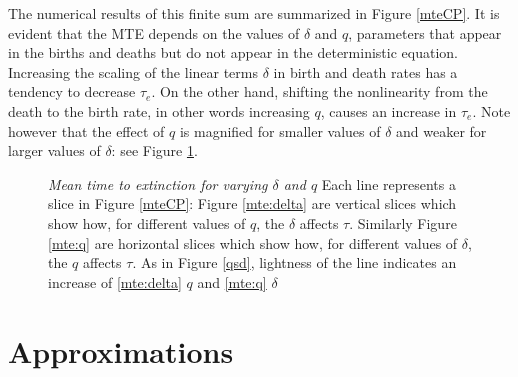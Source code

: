 \documentclass[a4paper,10pt]{article}
\numberwithin{equation}{section} %
\begin{document}
The numerical results of this finite sum are summarized in Figure \ref{mteCP}.
It is evident that the MTE depends on the values of $\delta$ and $q$, parameters that appear in the births and deaths but do not appear in the deterministic equation. 
Increasing the scaling of the linear terms $\delta$ in birth and death rates has a tendency to decrease $\tau_e$. 
On the other hand, shifting the nonlinearity from the death to the birth rate, in other words increasing $q$, causes an increase in $\tau_e$. 
Note however that the effect of $q$ is magnified for smaller values of $\delta$ and weaker for larger values of $\delta$: see Figure \ref{mte}. 

\begin{figure}[ht!]
	\centering
	\hfill
	\caption{\emph{Mean time to extinction for varying $\delta$ and $q$} Each line represents a slice in Figure \ref{mteCP}: Figure \ref{mte:delta} are vertical slices which show how, for different values of $q$, the $\delta$ affects $\tau$. Similarly Figure \ref{mte:q} are horizontal slices which show how, for different values of $\delta$, the $q$ affects $\tau$. As in Figure \ref{qsd}, lightness of the line indicates an increase of \ref{mte:delta} $q$ and \ref{mte:q} $\delta$}
	\label{mte}
\end{figure}














\section{Approximations}%
\end{document}
